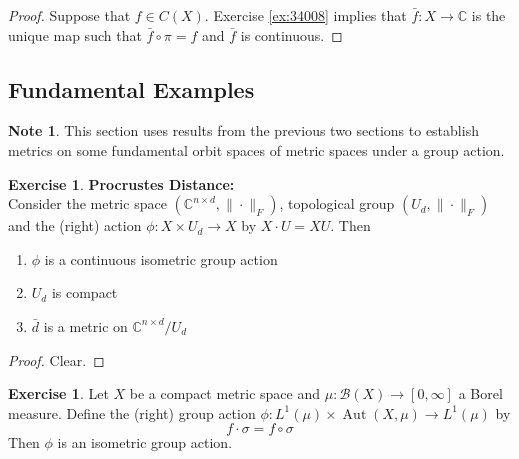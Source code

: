 \documentclass[12pt]{amsart}
\theoremstyle{definition}
\newtheorem{note}[definition]{Note}
\newtheorem{ex}[definition]{Exercise}
\newcommand{\sig}{\sigma}
\newcommand{\C}{\mathbb{C}}
\newcommand{\MB}{\mathcal{B}}
\newcommand{\tbf}[1]{\textbf{#1}}
\newcommand{\RG}{[0,\infty]}
\DeclareMathOperator{\Aut}{Aut}
\DeclareMathOperator*{\0}{\mbf{0}}
\DeclareMathOperator*{\1}{\mbf{1}}
\newcommand{\lex}[1]{\label{ex:#1}}
\newcommand{\rex}[1]{Exercise \ref{ex:#1}}
\begin{document}
	\begin{proof}
	Suppose that $f \in C(X)$. \rex{34008} implies that $\bar{f}: X \rightarrow \C$ is the unique map such that $\bar{f} \circ \pi = f$ and $\bar{f}$ is continuous. 
	\end{proof}
	
	
	
	
	
	
	
	
	
	
	
	
	
	
	
	
	
	
	
	
	
	

	
	
	
	
	
	
	
	
	
	
	\newpage
	\subsection{Fundamental Examples}
	\begin{note}
	This section uses results from the previous two sections to establish metrics on some fundamental orbit spaces of metric spaces under a group action. 
	\end{note} 
		
	
	\begin{ex} \lex{} \tbf{Procrustes Distance:} \\
	Consider the metric space $(\C^{n \times d}, \|\cdot\|_F)$, topological group $(U_d, \|\cdot\|_F)$ and  the (right) action $\phi: X \times U_d \rightarrow X$ by $X \cdot U = XU$. Then 
	\begin{enumerate}
	\item $\phi$ is a continuous isometric group action 
	\item $U_d$ is compact 
	\item $\bar{d}$ is a metric on $\C^{n \times d}/ U_d$
	\end{enumerate}
	\end{ex}
	
	\begin{proof}
	Clear.
	\end{proof}		
	
	\begin{ex} \lex{}
	Let $X$ be a compact metric space and $\mu:\MB(X) \rightarrow \RG$ a Borel measure. Define the (right) group action $\phi: L^1(\mu) \times \Aut(X, \mu) \rightarrow L^1(\mu) $ by $$f \cdot \sig = f \circ \sig$$ Then $\phi$ is an isometric group action. 
	\end{ex}
	
\end{document}
